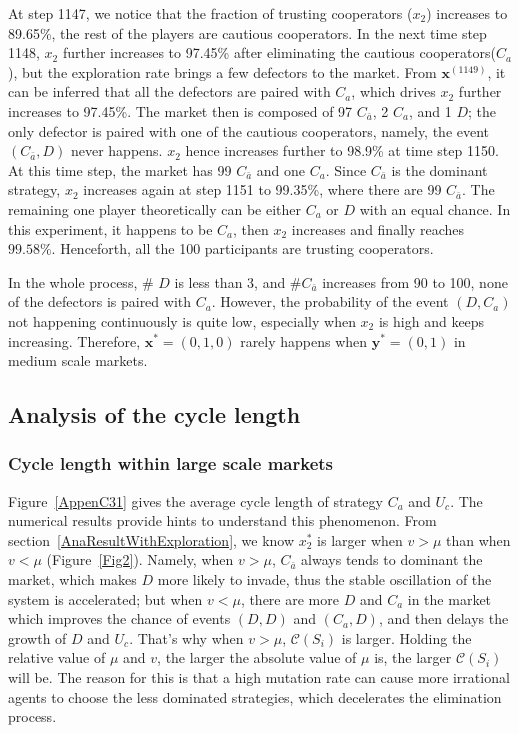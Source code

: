 \documentclass[letterpaper,10pt]{article}
\numberwithin{equation}{section}
\begin{document}
At step 1147, we notice that the fraction of trusting cooperators ($ x_{2} $) increases to 89.65\%, the rest of the players are cautious cooperators. In the next time step 1148, $ x_{2} $ further increases to 97.45\% after eliminating the cautious cooperators($ C_{a} $), but the exploration rate brings a few defectors to the market. From $ \mathbf{x}^{(1149)} $, it can be inferred that all the defectors are paired with $ C_{a} $, which drives $ x_{2} $ further increases to 97.45\%. The market then is composed of 97 $ C_{\bar{a}} $, 2 $ C_{a} $, and 1 $ D $; the only defector is paired with one of the cautious cooperators, namely, the event $ (C_{\bar{a}}, D) $ never happens. $ x_{2} $ hence increases further to 98.9\% at time step 1150. At this time step, the market has 99 $ C_{\bar{a}} $ and one $ C_{a} $. Since $ C_{\bar{a}} $ is the dominant strategy, $ x_{2} $ increases again at step 1151 to 99.35\%, where there are 99 $ C_{\bar{a}} $. The remaining one player theoretically can be either $ C_{a} $ or $ D $ with an equal chance. In this experiment, it happens to be $ C_{a} $, then $ x_{2} $ increases and finally reaches $ 99.58\% $. Henceforth, all the 100 participants are trusting cooperators. 

In the whole process, \# $ D $ is less than 3, and \#$ C_{\bar{a}} $ increases from 90 to 100, none of the defectors is paired with $ C_{a} $. However, the probability of the event $ (D, C_{a}) $ not happening continuously is quite low, especially when $ x_{2} $ is high and keeps increasing. Therefore, $ \mathbf{x}^* = (0, 1, 0) $ rarely happens when $ \mathbf{y}^* = (0, 1) $ in medium scale markets.

\subsection{Analysis of the cycle length} \label{AppendixC3}
\subsubsection{Cycle length within large scale markets}\label{AppendixC3_1000}
Figure~\ref{AppenC31} gives the average cycle length of strategy $ C_{a} $ and $ U_{c} $. The numerical results provide hints to understand this phenomenon. From section~\ref{AnaResultWithExploration}, we know $ x_{2}^* $ is larger when $ v > \mu $ than when $ v < \mu $ (Figure~\ref{Fig2}). Namely, when $ v > \mu $, $ C_{\bar{a}} $ always tends to dominant the market, which makes $ D $ more likely to invade, thus the stable oscillation of the system is accelerated; but when $ v < \mu $, there are more $ D $ and $ C_{a} $ in the market which improves the chance of events $ (D, D) $ and $ (C_{a}, D) $, and then delays the growth of $ D $ and $ U_{c} $. That's why when $ v > \mu $, $ \mathscr{C}(S_{i}) $ is larger. Holding the relative value of $ \mu $ and $ v $, the larger the absolute value of $ \mu $ is, the larger $ \mathscr{C}(S_{i}) $ will be. The reason for this is that a high mutation rate can cause more irrational agents to choose the less dominated strategies, which decelerates the elimination process.
\end{document}
